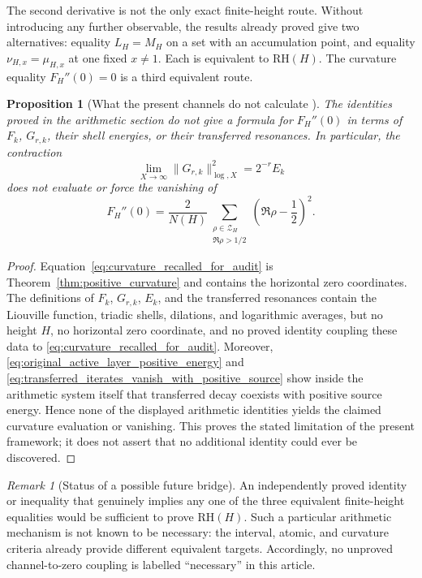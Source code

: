\documentclass[11pt]{amsart}
\numberwithin{equation}{section}
\theoremstyle{plain}
\newtheorem{proposition}[theorem]{Proposition}
\theoremstyle{definition}
\theoremstyle{remark}
\newtheorem{remark}[theorem]{Remark}
\newcommand{\RH}{\mathrm{RH}}
\begin{document}
The second derivative is not the only exact finite-height route.  Without introducing any further observable, the results already proved give two alternatives: equality $L_H=M_H$ on a set with an accumulation point, and equality $\nu_{H,x}=\mu_{H,x}$ at one fixed $x\neq1$.  Each is equivalent to $\RH(H)$.  The curvature equality $F_H''(0)=0$ is a third equivalent route.

\begin{proposition}[What the present channels do not calculate {}]
\label{prop:channels_do_not_calculate_curvature}
The identities proved in the arithmetic section do not give a formula for $F_H''(0)$ in terms of $F_k$, $G_{r,k}$, their shell energies, or their transferred resonances.  In particular, the contraction
\begin{equation}
\lim_{X\to\infty}\|G_{r,k}\|_{\log,X}^2=2^{-r}E_k
\label{eq:channel_decay_recalled}
\end{equation}
does not evaluate or force the vanishing of
\begin{equation}
F_H''(0)
=
\frac{2}{N(H)}
\sum_{\substack{\rho\in\mathcal Z_H\\\Re\rho>1/2}}
\left(\Re\rho-\frac12\right)^2.
\label{eq:curvature_recalled_for_audit}
\end{equation}
\end{proposition}

\begin{proof}
Equation~\eqref{eq:curvature_recalled_for_audit} is Theorem~\ref{thm:positive_curvature} and contains the horizontal zero coordinates.  The definitions of $F_k$, $G_{r,k}$, $E_k$, and the transferred resonances contain the Liouville function, triadic shells, dilations, and logarithmic averages, but no height $H$, no horizontal zero coordinate, and no proved identity coupling these data to \eqref{eq:curvature_recalled_for_audit}.  Moreover, \eqref{eq:original_active_layer_positive_energy} and \eqref{eq:transferred_iterates_vanish_with_positive_source} show inside the arithmetic system itself that transferred decay coexists with positive source energy.  Hence none of the displayed arithmetic identities yields the claimed curvature evaluation or vanishing.  This proves the stated limitation of the present framework; it does not assert that no additional identity could ever be discovered.
\end{proof}

\begin{remark}[Status of a possible future bridge]
\label{rem:future_bridge_status}
An independently proved identity or inequality that genuinely implies any one of the three equivalent finite-height equalities would be sufficient to prove $\RH(H)$.  Such a particular arithmetic mechanism is not known to be necessary: the interval, atomic, and curvature criteria already provide different equivalent targets.  Accordingly, no unproved channel-to-zero coupling is labelled ``necessary'' in this article.
\end{remark}
\end{document}
